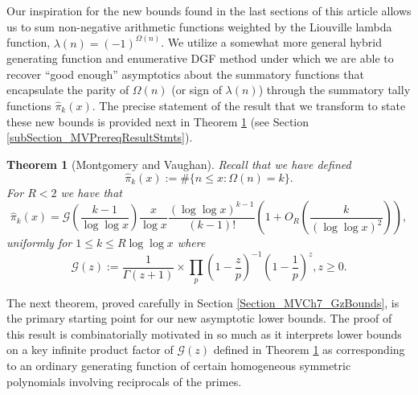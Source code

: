 \documentclass[11pt,reqno,a4letter]{article}
\numberwithin{figure}{section}
\numberwithin{table}{section}
\theoremstyle{plain}
\newtheorem{theorem}{Theorem}
\numberwithin{theorem}{section}
\theoremstyle{definition}
\begin{document}
Our inspiration for the new bounds found in the last sections of this article allows us to sum 
non-negative arithmetic functions weighted by the Liouville lambda function, 
$\lambda(n) = (-1)^{\Omega(n)}$. 
We utilize a somewhat more general 
hybrid generating function and enumerative DGF method 
under which we are able to recover ``good enough'' asymptotics about the summatory functions that 
encapsulate the parity of $\Omega(n)$ (or sign of $\lambda(n)$) 
through the summatory tally functions $\widehat{\pi}_k(x)$. 
The precise statement of the result that we transform to state these new bounds is provided next in 
Theorem \ref{theorem_HatPi_ExtInTermsOfGz} 
(see Section \ref{subSection_MVPrereqResultStmts}). 

\begin{theorem}[Montgomery and Vaughan]
\label{theorem_HatPi_ExtInTermsOfGz} 
Recall that we have defined 
$$\widehat{\pi}_k(x) := \#\{n \leq x: \Omega(n)=k\}.$$ 
For $R < 2$ we have that 
\[
\widehat{\pi}_k(x) = \mathcal{G}\left(\frac{k-1}{\log\log x}\right) \frac{x}{\log x} 
     \frac{(\log\log x)^{k-1}}{(k-1)!} \left(1 + O_R\left(\frac{k}{(\log\log x)^2}\right)\right),  
\]
uniformly for $1 \leq k \leq R \log\log x$ where 
\[
\mathcal{G}(z) := \frac{1}{\Gamma(z+1)} \times 
     \prod_p \left(1-\frac{z}{p}\right)^{-1} \left(1-\frac{1}{p}\right)^z, z \geq 0. 
\]
\end{theorem} 

The next theorem, proved carefully in Section \ref{Section_MVCh7_GzBounds}, 
is the primary starting point for our new asymptotic lower bounds. 
The proof of this result is combinatorially motivated in so much as it interprets 
lower bounds on a key infinite product factor of $\mathcal{G}(z)$ defined in 
Theorem \ref{theorem_HatPi_ExtInTermsOfGz} 
as corresponding to an ordinary generating function of certain 
homogeneous symmetric polynomials involving reciprocals of the primes. 
\end{document}
